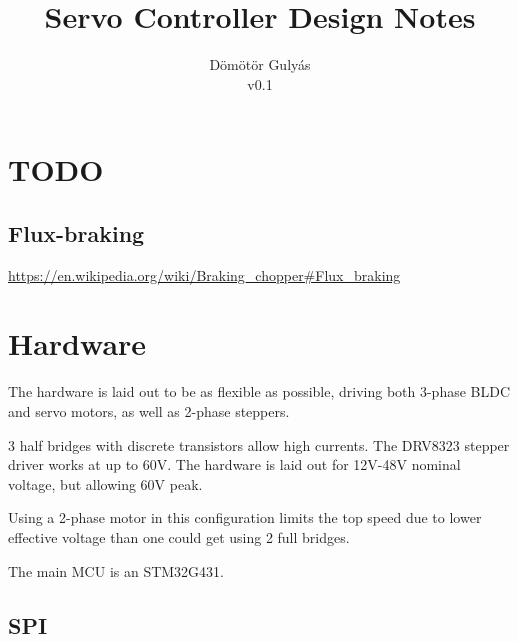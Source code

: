 \documentclass[12pt,a4paper,oneside,openany]{article}
\begin{document}
\title{Servo Controller Design Notes}
\author{Dömötör Gulyás\\v0.1}

\maketitle

%
%
%

\tableofcontents




\section{TODO}

\subsection{Flux-braking}
\href{https://en.wikipedia.org/wiki/Braking_chopper#Flux_braking}{https://en.wikipedia.org/wiki/Braking\_chopper\#Flux\_braking}


\section{Hardware}

The hardware is laid out to be as flexible as possible, driving both 3-phase BLDC and servo motors, as well as 2-phase steppers.

3 half bridges with discrete transistors allow high currents. The DRV8323 stepper driver works at up to 60V. The hardware is laid out for 12V-48V nominal voltage, but allowing 60V peak.

Using a 2-phase motor in this configuration limits the top speed due to lower effective voltage than one could get using 2 full bridges.

The main MCU is an STM32G431.

\subsection{SPI}
\end{document}
